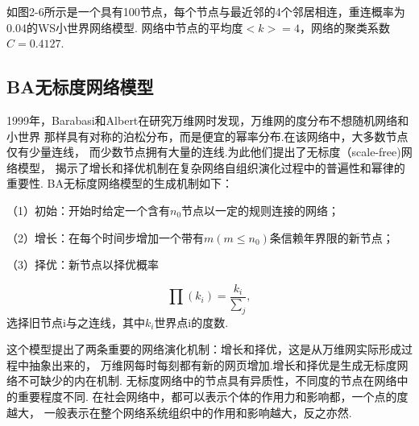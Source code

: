 \documentclass[bachelor,adobefonts]{jnuthesis}
\begin{document}
如图2-6所示是一个具有100节点，每个节点与最近邻的4个邻居相连，重连概率为0.04的WS小世界网络模型.
网络中节点的平均度$<k> = 4$，网络的聚类系数$C = 0.4127$.


\subsection{BA无标度网络模型}
1999年，Barabasi和Albert在研究万维网时发现，万维网的度分布不想随机网络和小世界
那样具有对称的泊松分布，而是便宜的幂率分布.在该网络中，大多数节点仅有少量连线，
而少数节点拥有大量的连线.为此他们提出了无标度（scale-free)网络模型，
揭示了增长和择优机制在复杂网络自组织演化过程中的普遍性和幂律的重要性.
BA无标度网络模型的生成机制如下：

（1）初始：开始时给定一个含有$n_0$节点以一定的规则连接的网络；

（2）增长：在每个时间步增加一个带有$m(m \leq n_0)$条信赖年界限的新节点；

（3）择优：新节点以择优概率

\begin{equation}
  \prod (k_i) = \frac{k_i}{\sum_{j}^{}},
\end{equation}
选择旧节点i与之连线，其中$k_i$世界点i的度数.

这个模型提出了两条重要的网络演化机制：增长和择优，这是从万维网实际形成过程中抽象出来的，
万维网每时每刻都有新的网页增加.增长和择优是生成无标度网络不可缺少的内在机制.
无标度网络中的节点具有异质性，不同度的节点在网络中的重要程度不同.
在社会网络中，都可以表示个体的作用力和影响都，一个点的度越大，
一般表示在整个网络系统组织中的作用和影响越大，反之亦然.
\end{document}
